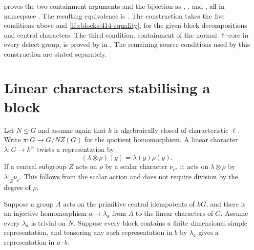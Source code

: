 \begin{implementation}
 proves the two
containment arguments and the bijection as
,
, and
, all in namespace
. The resulting equivalence is
.
The construction takes the five conditions above and
\eqref{lib:blocks:414-equality}, for the given block decompositions
and central characters. The third condition, containment of the normal
$\ell$-core in every defect group, is proved by
 in
.
The remaining source
conditions used by this construction are stated separately.
\end{implementation}

\section{Linear characters stabilising a block}
\label{lib:blocks:linear-stabilisers}

Let $N\trianglelefteq G$ and assume again that $k$ is algebraically
closed of characteristic $\ell$. Write $\pi:G\to G/NZ(G)$ for the
quotient homomorphism. A linear character
$\lambda:G\to k^\times$ twists a representation by
\[
 (\lambda\otimes\rho)(g)=\lambda(g)\rho(g).
\]
If a central subgroup $Z$ acts on $\rho$ by a scalar character
$\nu_\rho$, it acts on $\lambda\otimes\rho$ by
$\lambda|_Z\nu_\rho$. This follows from the scalar action and does
not require division by the degree of $\rho$.

Suppose a group $A$ acts on the primitive central idempotents of $kG$, and there
is an injective homomorphism
$a\mapsto\lambda_a$ from $A$ to the linear characters of $G$.
Assume every $\lambda_a$ is trivial on $N$. Suppose every block contains
a finite dimensional simple representation, and tensoring any such
representation in $b$ by $\lambda_a$ gives a representation in
$a\cdot b$.

